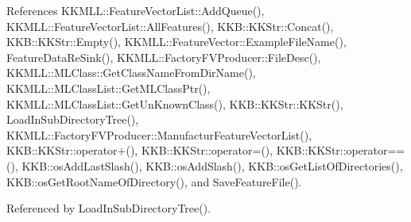 References K\+K\+M\+L\+L\+::\+Feature\+Vector\+List\+::\+Add\+Queue(), K\+K\+M\+L\+L\+::\+Feature\+Vector\+List\+::\+All\+Features(), K\+K\+B\+::\+K\+K\+Str\+::\+Concat(), K\+K\+B\+::\+K\+K\+Str\+::\+Empty(), K\+K\+M\+L\+L\+::\+Feature\+Vector\+::\+Example\+File\+Name(), Feature\+Data\+Re\+Sink(), K\+K\+M\+L\+L\+::\+Factory\+F\+V\+Producer\+::\+File\+Desc(), K\+K\+M\+L\+L\+::\+M\+L\+Class\+::\+Get\+Class\+Name\+From\+Dir\+Name(), K\+K\+M\+L\+L\+::\+M\+L\+Class\+List\+::\+Get\+M\+L\+Class\+Ptr(), K\+K\+M\+L\+L\+::\+M\+L\+Class\+List\+::\+Get\+Un\+Known\+Class(), K\+K\+B\+::\+K\+K\+Str\+::\+K\+K\+Str(), Load\+In\+Sub\+Directory\+Tree(), K\+K\+M\+L\+L\+::\+Factory\+F\+V\+Producer\+::\+Manufactur\+Feature\+Vector\+List(), K\+K\+B\+::\+K\+K\+Str\+::operator+(), K\+K\+B\+::\+K\+K\+Str\+::operator=(), K\+K\+B\+::\+K\+K\+Str\+::operator==(), K\+K\+B\+::os\+Add\+Last\+Slash(), K\+K\+B\+::os\+Add\+Slash(), K\+K\+B\+::os\+Get\+List\+Of\+Directories(), K\+K\+B\+::os\+Get\+Root\+Name\+Of\+Directory(), and Save\+Feature\+File().



Referenced by Load\+In\+Sub\+Directory\+Tree().


